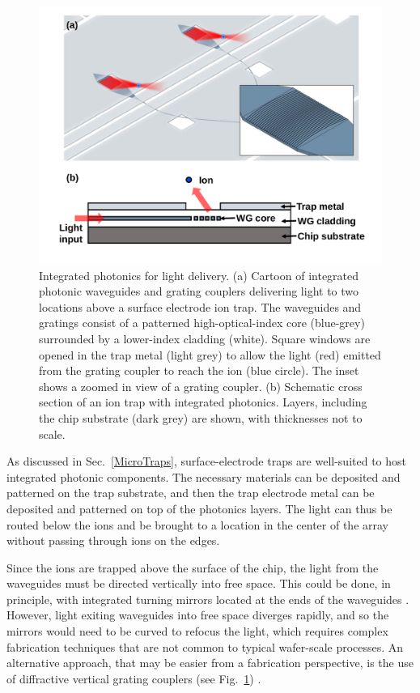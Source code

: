\documentclass[%
12pt,
 amsmath,amssymb,
]{revtex4-2}
\begin{document}
\begin{figure}[tp]
\includegraphics[width=0.9\columnwidth]{IntegratedPhotonics_v2.pdf}
\caption{Integrated photonics for light delivery.  (a) Cartoon of integrated photonic waveguides and grating couplers delivering light to two locations above a surface electrode ion trap.  The waveguides and gratings consist of a patterned high-optical-index core (blue-grey) surrounded by a lower-index cladding (white).  Square windows are opened in the trap metal (light grey) to allow the light (red) emitted from the grating coupler to reach the ion (blue circle).  The inset shows a zoomed in view of a grating coupler. (b) Schematic cross section of an ion trap with integrated photonics.  Layers, including the chip substrate (dark grey) are shown, with thicknesses not to scale.}
\label{fig:intphot}
\end{figure}

As discussed in Sec.~\ref{MicroTraps}, surface-electrode traps are well-suited to host integrated photonic components.  The necessary materials can be deposited and patterned on the trap substrate, and then the trap electrode metal can be deposited and patterned on top of the photonics layers.  The light can thus be routed below the ions and be brought to a location in the center of the array without passing through ions on the edges.

Since the ions are trapped above the surface of the chip, the light from the waveguides must be directed vertically into free space.  This could be done, in principle, with integrated turning mirrors located at the ends of the waveguides \cite{TangTurningmirror2002}.  However, light exiting waveguides into free space diverges rapidly, and so the mirrors would need to be curved to refocus the light, which requires complex fabrication techniques that are not common to typical wafer-scale processes.  An alternative approach, that may be easier from a fabrication perspective, is the use of diffractive vertical grating couplers (see Fig.~\ref{fig:intphot}) \cite{MehtaIntegrated2016,MehtaThesis2017}.
\end{document}
